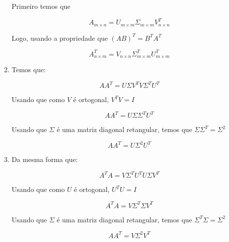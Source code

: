 \documentclass[11pt]{article}
\begin{document}
\begin{exerc}
\begin{enumerate}

Primeiro temos que

$$A_{m \times n} = U_{m \times m} \Sigma_{m \times m} V^T_{n \times n}$$

Logo, usando a propriedade que $(A B)^T = B^T A^T$

$$A^T_{n \times m} = V_{n \times n} \Sigma^T_{m \times m} U^T_{m \times m}$$

\item
Temos que:

$$A A^T = U \Sigma V^T V \Sigma^T U^T$$

Usando que como $V$ é ortogonal, $V^T V = I$

$$A A^T = U \Sigma \Sigma^T U^T$$

Usando que $\Sigma$ é uma matriz diagonal retangular, temos que $\Sigma \Sigma^T = \Sigma^2$

$$A A^T = U \Sigma^2 U^T$$

\item
Da mesma forma que:

$$A^T A = V \Sigma^T U^T U \Sigma V^T$$

Usando que como $U$ é ortogonal, $U^T U = I$

$$A^T A = V \Sigma^T \Sigma V^T$$

Usando que $\Sigma$ é uma matriz diagonal retangular, temos que $\Sigma^T \Sigma = \Sigma^2$

$$A A^T = V \Sigma^2 V^T$$

\end{enumerate}
\end{exerc}
\end{document}
